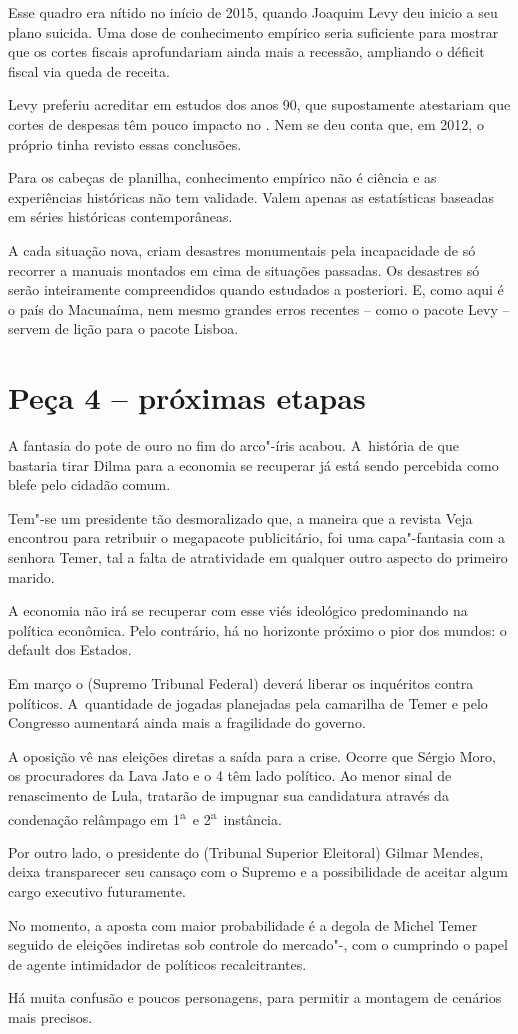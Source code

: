 Esse quadro era nítido no início de 2015, quando Joaquim Levy deu inicio
a seu plano suicida. Uma dose de conhecimento empírico seria suficiente
para mostrar que os cortes fiscais aprofundariam ainda mais a recessão,
ampliando o déficit fiscal via queda de receita.

Levy preferiu acreditar em estudos dos anos 90, que supostamente
atestariam que cortes de despesas têm pouco impacto no . Nem se deu
conta que, em 2012, o próprio  tinha revisto essas conclusões.

Para os cabeças de planilha, conhecimento empírico não é ciência e as
experiências históricas não tem validade. Valem apenas as estatísticas
baseadas em séries históricas contemporâneas.

A cada situação nova, criam desastres monumentais pela incapacidade de
só recorrer a manuais montados em cima de situações passadas. Os
desastres só serão inteiramente compreendidos quando estudados a
posteriori. E, como aqui é o país do Macunaíma, nem mesmo grandes erros
recentes -- como o pacote Levy -- servem de lição para o pacote Lisboa.

\section{Peça 4 -- próximas etapas}

A fantasia do pote de ouro no fim do arco"-íris acabou. A~história de que
bastaria tirar Dilma para a economia se recuperar já está sendo
percebida como blefe pelo cidadão comum.

Tem"-se um presidente tão desmoralizado que, a maneira que a revista Veja
encontrou para retribuir o megapacote publicitário, foi uma
capa"-fantasia com a senhora Temer, tal a falta de atratividade em
qualquer outro aspecto do primeiro marido.

A economia não irá se recuperar com esse viés ideológico predominando na
política econômica. Pelo contrário, há no horizonte próximo o pior dos
mundos: o default dos Estados.

Em março o  (Supremo Tribunal Federal) deverá liberar os inquéritos
contra políticos. A~quantidade de jogadas planejadas pela camarilha de
Temer e pelo Congresso aumentará ainda mais a fragilidade do governo.

A oposição vê nas eleições diretas a saída para a crise. Ocorre que
Sérgio Moro, os procuradores da Lava Jato e o 4 têm lado político. Ao
menor sinal de renascimento de Lula, tratarão de impugnar sua
candidatura através da condenação relâmpago em 1\textsuperscript{a}~e
2\textsuperscript{a}~instância.

Por outro lado, o presidente do  (Tribunal Superior Eleitoral) Gilmar
Mendes, deixa transparecer seu cansaço com o Supremo e a possibilidade
de aceitar algum cargo executivo futuramente.

No momento, a aposta com maior probabilidade é a degola de Michel Temer
seguido de eleições indiretas sob controle do mercado"-, com o 
cumprindo o papel de agente intimidador de políticos recalcitrantes.

Há muita confusão e poucos personagens, para permitir a montagem de
cenários mais precisos.
